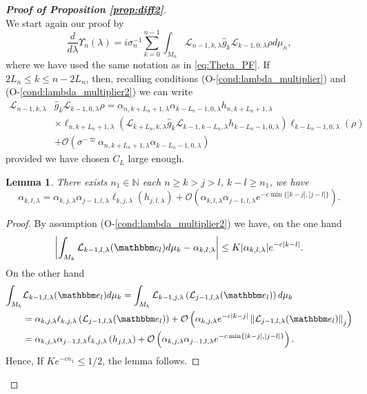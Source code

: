 \documentclass{amsart}
\numberwithin{equation}{section}
\newtheorem{lem}[thm]{Lemma}
\newcommand\cL{{\mathcal L}}
\newcommand\cO{{\mathcal O}}
\newcommand\bN{{\mathbb N}}
\newcommand{\bbe}{\mathbbm e}
\begin{document}
\begin{proof}[\bf \em  Proof of Proposition \ref{prop:diff2}]\ \\
We start again our proof by 
\begin{equation}\label{eq:step5.1}
\frac{d}{d\lambda}\Upsilon_n(\lambda)=i\sigma_n^{-1}\sum_{k=0}^{n-1}\int_{M_n}\cL_{n-1 ,k,\lambda}\hat g_k\cL_{k-1,0,\lambda}\rho d\mu_n,
\end{equation}
where we have used the same notation as in \eqref{eq:Theta_PF}.
If $2L_n\leq k\leq n-2L_n$, then, recalling conditions (O-\ref{cond:lambda_multiplier}) and (O-\ref{cond:lambda_multiplier2}) we can write
\begin{equation}\label{eq:complex_1}
\begin{split}
\cL_{ n-1,k,\lambda}&\hat g_k\cL_{k-1,0,\lambda}\rho=\alpha_{n,k+L_n+1,\lambda}\alpha_{k-L_n-1,0,\lambda} h_{n,k+L_n+1,\lambda}\\
&\times \ell_{n,k+L_n+1,\lambda}(\cL_{k+L_n,k,\lambda}\hat g_k\cL_{k-1,k-L_n,\lambda}h_{k-L_n-1,0,\lambda})\ell_{k-L_n-1,0,\lambda}(\rho)\\
&+\cO(\sigma^{-\varpi}\alpha_{n,k+L_n+1,\lambda}\alpha_{k-L_n-1,0,\lambda})
\end{split}
\end{equation}
provided we have chosen $C_L$ large enough.

\begin{lem} \label{lem:coalesce} There exists $n_1\in\bN$ each $n\geq k>j>l$, $k-l\geq n_1$, we have
\[
\alpha_{k,l,\lambda}=\alpha_{k,j,\lambda}\alpha_{j-1, l,\lambda}\ell_{k,j,\lambda}\left(h_{j,l,\lambda}\right)+\cO\left(\alpha_{k,l,\lambda}\alpha_{j-1,l,\lambda}e^{-c\min\{|k-j |, |j-l|\}}\right).
\]
\end{lem}
\begin{proof}
By assumption (O-\ref{cond:lambda_multiplier2}) we have, on the one hand
\[
\left|\int_{M_k}\cL_{k-1,l,\lambda}(\bbe_l)d\mu_k-\alpha_{k,l,\lambda}\right|\leq K|\alpha_{k,l,\lambda}|e^{-c|k-l |}.
\]
On the other hand
\[
\begin{split}
\int_{M_k}&\cL_{k-1,l,\lambda}(\bbe_l)d\mu_k=\int_{M_k}\cL_{k-1,j,\lambda}\left(\cL_{j-1,l,\lambda}(\bbe_l)\right)d\mu_k\\
&=\alpha_{k,j,\lambda}\ell_{k,j,\lambda}\left(\cL_{j-1,l,\lambda}(\bbe_l)\right)+\cO\left(\alpha_{k,j,\lambda}e^{-c|k-j |}\left\|\cL_{j-1,l,\lambda}(\bbe_l)\right\|_j\right)\\
&=\alpha_{k,j,\lambda}\alpha_{j-1,l,\lambda}\ell_{k,j,\lambda}\left(h_{j,l,\lambda}\right)+\cO\left(\alpha_{k,j,\lambda}\alpha_{j-1,l,\lambda}e^{-c\min\{|k-j |, |j-l|\}}\right).
\end{split}
\]
Hence, If $Ke^{-cn_1}\leq 1/2$, the lemma follows.
\end{proof}


\end{proof}
\end{document}
